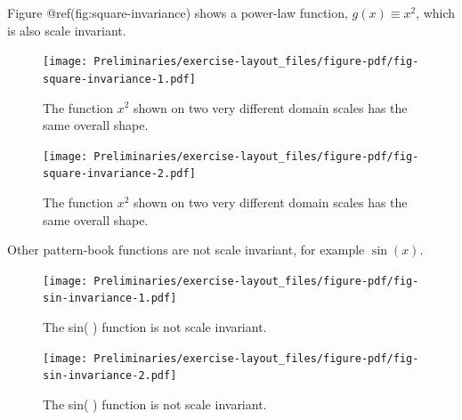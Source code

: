 \documentclass[
  letterpaper,
  DIV=11,
  numbers=noendperiod,
  oneside]{article}
\begin{document}
\begin{multicols}{2}
\begin{figure}
\end{figure}

Figure @ref(fig:square-invariance) shows a power-law function,
\(g(x) \equiv x^2\), which is also scale invariant.

\begin{figure}

{\centering \texttt{[image: Preliminaries/exercise-layout\_files/figure-pdf/fig-square-invariance-1.pdf]}

}

\caption{\label{fig-square-invariance-1}The function \(x^2\) shown on
two very different domain scales has the same overall shape.}

\end{figure}

\begin{figure}

{\centering \texttt{[image: Preliminaries/exercise-layout\_files/figure-pdf/fig-square-invariance-2.pdf]}

}

\caption{\label{fig-square-invariance-2}The function \(x^2\) shown on
two very different domain scales has the same overall shape.}

\end{figure}

Other pattern-book functions are not scale invariant, for example
\(\sin(x)\).

\begin{figure}

{\centering \texttt{[image: Preliminaries/exercise-layout\_files/figure-pdf/fig-sin-invariance-1.pdf]}

}

\caption{\label{fig-sin-invariance-1}The sin( ) function is not scale
invariant.}

\end{figure}

\begin{figure}

{\centering \texttt{[image: Preliminaries/exercise-layout\_files/figure-pdf/fig-sin-invariance-2.pdf]}

}

\caption{\label{fig-sin-invariance-2}The sin( ) function is not scale
invariant.}

\end{figure}


\end{multicols}
\end{document}
